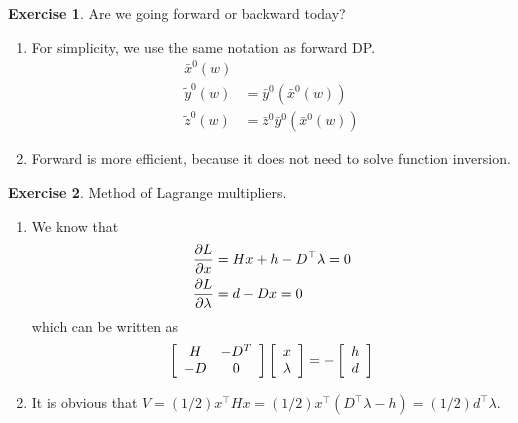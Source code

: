 \documentclass[11pt,a4paper]{report}
\theoremstyle{definition}\newtheorem{exercise}{Exercise}[chapter]
\begin{document}
\begin{exercise} Are we going forward or backward today?\\
\end{exercise}
\begin{answer}
\begin{enumerate}[label=(\alph*)]
    \item For simplicity, we use the same notation as forward DP.
    \begin{align}
        \bar{x}^0(w)&\\
        \tilde{y}^0(w) &= \bar{y}^0(\bar{x}^0(w))\\
        \tilde{z}^0(w) &= \bar{z}^0\bar{y}^0(\bar{x}^0(w))
    \end{align}
    \item Forward is more efficient, because it does not need to solve function inversion.
\end{enumerate}
\end{answer}

\begin{exercise}Method of Lagrange multipliers.\\
\end{exercise}
\begin{answer}
\begin{enumerate}[label=(\alph*)]
    \item We know that
    \begin{align}
        \pdv{L}{x}&=Hx+h-D^\top\lambda=0\\
        \pdv{L}{\lambda}&=d-Dx=0
    \end{align}
    which can be written as
    \begin{equation}
        \left[\begin{array}{c c}{{H}}&{{-D^{T}}}\\ {{-D}}&{{0}}\\ \end{array}\right]\left[\begin{array}{c}{{x}}\\ {{\lambda}}\\ \end{array}\right]=-\left[\begin{array}{c}{{h}}\\ {{d}}\\ \end{array}\right]
    \end{equation}
    \item It is obvious that $V=(1/2)x^\top Hx=(1/2)x^\top(D^\top\lambda-h)=(1/2)d^\top\lambda$.
\end{enumerate}
\end{answer}
\end{document}
